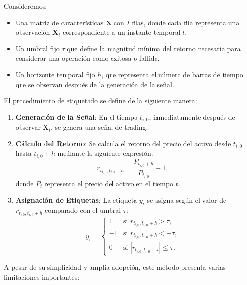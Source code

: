 \documentclass[a4paper,12pt, twoside]{report}
\begin{document}
Consideremos:

\begin{itemize}
    \item Una matriz de características $\mathbf{X}$ con $I$ filas, donde cada fila representa una observación $\mathbf{X}_i$ correspondiente a un instante temporal $t$.
    \item Un umbral fijo $\tau$ que define la magnitud mínima del retorno necesaria para considerar una operación como exitosa o fallida.
    \item Un horizonte temporal fijo $h$, que representa el número de barras de tiempo que se observan después de la generación de la señal.
\end{itemize}

El procedimiento de etiquetado se define de la siguiente manera:

\begin{enumerate}
    \item \textbf{Generación de la Señal}: En el tiempo $t_{i,0}$, inmediatamente después de observar $\mathbf{X}_i$, se genera una señal de trading.
    \item \textbf{Cálculo del Retorno}: Se calcula el retorno del precio del activo desde $t_{i,0}$ hasta $t_{i,0} + h$ mediante la siguiente expresión:
    \begin{equation}
        r_{t_{i,0}, t_{i,0}+h} = \frac{P_{t_{i,0}+h}}{P_{t_{i,0}}} - 1,
    \end{equation}
    donde $P_t$ representa el precio del activo en el tiempo $t$.
    \item \textbf{Asignación de Etiquetas}: La etiqueta $y_i$ se asigna según el valor de $r_{t_{i,0}, t_{i,0}+h}$ comparado con el umbral $\tau$:
    \begin{equation}
        y_i = 
        \begin{cases} 
            1 & \text{si } r_{t_{i,0}, t_{i,0}+h} > \tau, \\
            -1 & \text{si } r_{t_{i,0}, t_{i,0}+h} < -\tau, \\
            0 & \text{si } |r_{t_{i,0}, t_{i,0}+h}| \leq \tau.
        \end{cases}
    \end{equation}
\end{enumerate}


A pesar de su simplicidad y amplia adopción, este método presenta varias limitaciones importantes:
\end{document}
